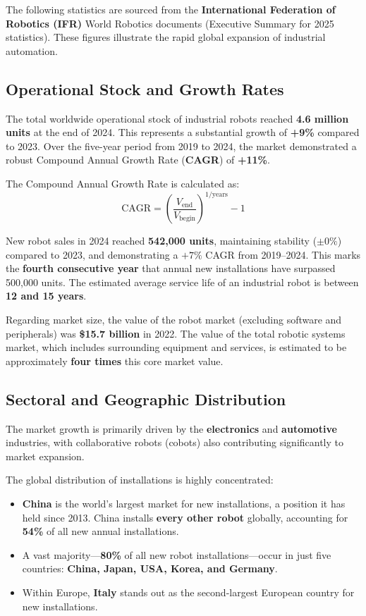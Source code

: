\documentclass[10pt, letterpaper]{report}
\begin{document}
The following statistics are sourced from the \textbf{International Federation of Robotics (IFR)} World Robotics documents (Executive Summary for 2025 statistics). These figures illustrate the rapid global expansion of industrial automation.

\subsection{Operational Stock and Growth Rates}
The total worldwide operational stock of industrial robots reached \textbf{4.6 million units} at the end of 2024. This represents a substantial growth of \textbf{+9\%} compared to 2023. Over the five-year period from 2019 to 2024, the market demonstrated a robust Compound Annual Growth Rate (\textbf{CAGR}) of \textbf{+11\%}.

The Compound Annual Growth Rate is calculated as:
$$\text{CAGR} = \left(\frac{V_{\text{end}}}{V_{\text{begin}}}\right)^{1/\text{years}} - 1$$

New robot sales in 2024 reached \textbf{542,000 units}, maintaining stability ($\pm 0\%$) compared to 2023, and demonstrating a $+7\%$ CAGR from 2019–2024. This marks the \textbf{fourth consecutive year} that annual new installations have surpassed 500,000 units. The estimated average service life of an industrial robot is between \textbf{12 and 15 years}.

Regarding market size, the value of the robot market (excluding software and peripherals) was \textbf{\$15.7 billion} in 2022. The value of the total robotic systems market, which includes surrounding equipment and services, is estimated to be approximately \textbf{four times} this core market value.

\subsection{Sectoral and Geographic Distribution}
The market growth is primarily driven by the \textbf{electronics} and \textbf{automotive} industries, with collaborative robots (cobots) also contributing significantly to market expansion.

The global distribution of installations is highly concentrated:
\begin{itemize}
    \item \textbf{China} is the world's largest market for new installations, a position it has held since 2013. China installs \textbf{every other robot} globally, accounting for \textbf{54\%} of all new annual installations.
    \item A vast majority—\textbf{80\%} of all new robot installations—occur in just five countries: \textbf{China, Japan, USA, Korea, and Germany}.
    \item Within Europe, \textbf{Italy} stands out as the second-largest European country for new installations.
\end{itemize}
\end{document}
